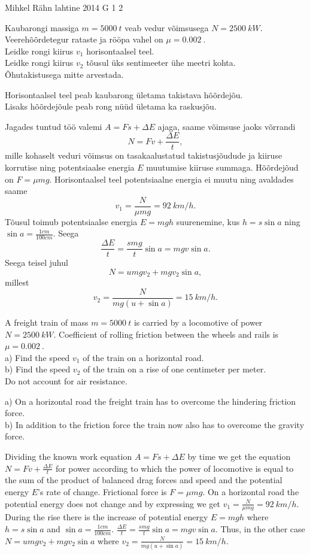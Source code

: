 {Mihkel Rähn} %
{lahtine} %
{2014} %
{G 1} %
{2} %
{
\ifStatement
Kaubarongi massiga $m=\SI{5000}{t}$ veab vedur võimsusega $N=\SI{2500}{kW}$. Veerehõõrdetegur rataste ja rööpa vahel on $\mu=\SI{0,002}{}$.\\
\osa Leidke rongi kiirus $v_1$ horisontaalsel teel.\\
\osa Leidke rongi kiirus $v_2$ tõusul üks sentimeeter ühe meetri kohta.\\
Õhutakistusega mitte arvestada.
\fi


\ifHint
\osa Horisontaalsel teel peab kaubarong ületama takistava hõõrdejõu.\\
\osa Lisaks hõõrdejõule peab rong nüüd ületama ka raskusjõu.
\fi


\ifSolution
Jagades tuntud töö valemi $A=Fs+\Delta E$ ajaga, saame võimsuse jaoks võrrandi 
\[
N=Fv+\frac{\Delta E}{t},
\]
mille kohaselt veduri võimsus on tasakaalustatud takistusjõudude ja kiiruse korrutise ning potentsiaalse energia $E$ muutumise kiiruse summaga. Hõõrdejõud on $F=\mu mg$. Horisontaalsel teel potentsiaalne energia ei muutu ning avaldades saame
\[
v_1=\frac{N}{\mu mg}=\SI{92}{km \per h}.
\]
Tõusul toimub potentsiaalse energia $E=mgh$ suurenemine, kus $h=s\sin a$ ning $\sin a=\frac{1cm}{100cm}$. Seega
\[
\frac{\Delta E}{t}=\frac{smg}{t}\sin a=mgv\sin a.
\]
Seega teisel juhul
\[
N=umgv_2+mgv_2\sin a,
\]
millest
\[
v_2=\frac{N}{mg(u+\sin a)}=\SI{15}{km \per h}.
\]
\fi


\ifEngStatement
A freight train of mass $m=\SI{5000}{t}$ is carried by a locomotive of power $N=\SI{2500}{kW}$. Coefficient of rolling friction between the wheels and rails is $\mu=\SI{0,002}{}$.\\
a) Find the speed $v_1$ of the train on a horizontal road.\\
b) Find the speed $v_2$ of the train on a rise of one centimeter per meter.\\
Do not account for air resistance.
\fi


\ifEngHint
a) On a horizontal road the freight train has to overcome the hindering friction force.\\
b) In addition to the friction force the train now also has to overcome the gravity force.
\fi


\ifEngSolution
Dividing the known work equation $A=Fs+\Delta E$ by time we get the equation $N=Fv+\frac{\Delta E}{t}$ for power according to which the power of locomotive is equal to the sum of the product of balanced drag forces and speed and the potential energy $E$’s rate of change. Frictional force is $F=\mu mg$. On a horizontal road the potential energy does not change and by expressing we get $v_1=\frac{N}{\mu mg}=\SI{92}{km \per h}$. During the rise there is the increase of potential energy $E=mgh$ where $h=s\sin a$ and $\sin a= \frac{1cm}{100cm}$. $\frac{\Delta E}{t}=\frac{smg}{t}\sin a=mgv\sin a$. Thus, in the other case $N=umgv_2+mgv_2\sin a$ where $v_2=\frac{N}{mg(u+\sin a)}=\SI{15}{km \per h}$.
\fi
}